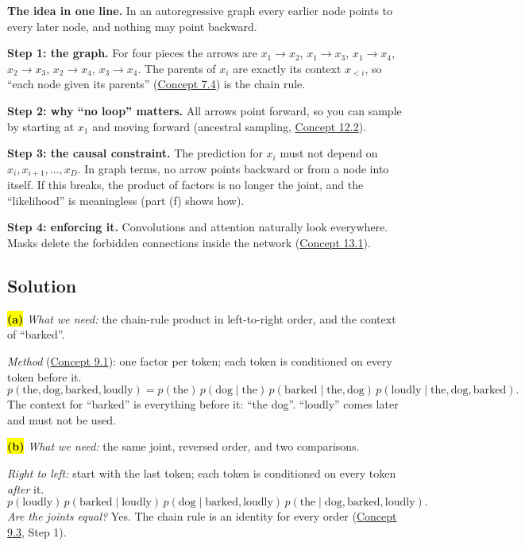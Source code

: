 \documentclass[12pt,a4paper]{article}
\begin{document}
\textbf{The idea in one line.} In an autoregressive graph every earlier node points to every later node, and nothing may point backward.

\textbf{Step 1: the graph.} For four pieces the arrows are $x_1\to x_2$, $x_1\to x_3$, $x_1\to x_4$, $x_2\to x_3$, $x_2\to x_4$, $x_3\to x_4$. The parents of $x_i$ are exactly its context $x_{<i}$, so ``each node given its parents'' (\hyperref[c7-4]{Concept 7.4}) is the chain rule.

\textbf{Step 2: why ``no loop'' matters.} All arrows point forward, so you can sample by starting at $x_1$ and moving forward (ancestral sampling, \hyperref[c12-2]{Concept 12.2}).

\textbf{Step 3: the causal constraint.} The prediction for $x_i$ must not depend on $x_i,x_{i+1},\dots,x_D$. In graph terms, no arrow points backward or from a node into itself. If this breaks, the product of factors is no longer the joint, and the ``likelihood'' is meaningless (part (f) shows how).

\textbf{Step 4: enforcing it.} Convolutions and attention naturally look everywhere. Masks delete the forbidden connections inside the network (\hyperref[c13-1]{Concept 13.1}).

\subsection{Solution}

\colorbox{yellow}{\textbf{(a)}} \emph{What we need:} the chain-rule product in left-to-right order, and the context of ``barked''.

\emph{Method} (\hyperref[c9-1]{Concept 9.1}): one factor per token; each token is conditioned on every token before it.
\[
p(\text{the},\text{dog},\text{barked},\text{loudly})=p(\text{the})\,p(\text{dog}\mid\text{the})\,p(\text{barked}\mid\text{the},\text{dog})\,p(\text{loudly}\mid\text{the},\text{dog},\text{barked}).
\]
The context for ``barked'' is everything before it: ``the dog''. ``loudly'' comes later and must not be used.

\colorbox{yellow}{\textbf{(b)}} \emph{What we need:} the same joint, reversed order, and two comparisons.

\emph{Right to left:} start with the last token; each token is conditioned on every token \emph{after} it.
\[
p(\text{loudly})\,p(\text{barked}\mid\text{loudly})\,p(\text{dog}\mid\text{barked},\text{loudly})\,p(\text{the}\mid\text{dog},\text{barked},\text{loudly}).
\]
\emph{Are the joints equal?} Yes. The chain rule is an identity for every order (\hyperref[c9-3]{Concept 9.3}, Step 1).
\end{document}
